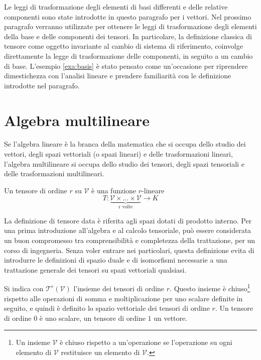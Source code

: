 %
Le leggi di trasformazione degli elementi di basi differenti e delle relative componenti sono state introdotte in questo paragrafo per i vettori. Nel prossimo paragrafo verranno utilizzate per ottenere le leggi di trasformazione degli elementi della base e delle componenti dei tensori. In particolare, la definizione classica di tensore come oggetto invariante al cambio di sistema di riferimento, coinvolge direttamente la legge di trasformazione delle componenti, in seguito a un cambio di base. L'esempio \ref{exa:basis} è stato pensato come un'occasione per riprendere dimestichezza con l'analisi lineare e prendere familiarità con le definizione introdotte nel paragrafo.


\newpage

\section{Algebra multilineare}
Se l'algebra lineare è la branca della matematica che si occupa dello studio dei vettori, degli spazi vettoriali (o spazi lineari) e delle trasformazioni lineari, l'algebra multilineare si occupa dello studio dei tensori, degli spazi tensoriali e delle trasformazioni multilineari.

\begin{definition}\label{def:tensIntrinseca}
 Un tensore di ordine $r$ su $\mathcal{V}$ è una funzione
 $r$-lineare
\begin{equation}
   T : \underbrace{\mathcal{V}   \times \dots \times \mathcal{V}  }_{\text{r volte}} \rightarrow K
\end{equation}
\end{definition}
%
\begin{remark}
 La definizione di tensore data è riferita agli spazi dotati di prodotto interno. Per una prima introduzione all'algebra e al calcolo tensoriale, può essere considerata un buon compromesso tra comprensibilità e completezza della trattazione, per un corso di ingegneria. Senza voler entrare nei particolari, questa definizione evita di introdurre le definizioni di spazio duale e di isomorfismi necessarie a una trattazione generale dei tensori su spazi vettoriali qualsiasi.
\end{remark}
%
  Si indica con $\mathcal{T}^r(\mathcal{V})$ l'insieme dei tensori di ordine $r$. Questo insieme è chiuso\footnote{Un insieme $\mathcal{V}$ è chiuso rispetto a un'operazione se l'operazione su ogni elemento di $\mathcal{V}$ restituisce un elemento di $\mathcal{V}$.} rispetto alle operazioni di somma e moltiplicazione per uno scalare definite in seguito, e quindi è definito lo spazio vettoriale dei tensori di ordine $r$. %
 Un tensore di ordine $0$ è uno scalare, un tensore di ordine $1$ un vettore.
 
